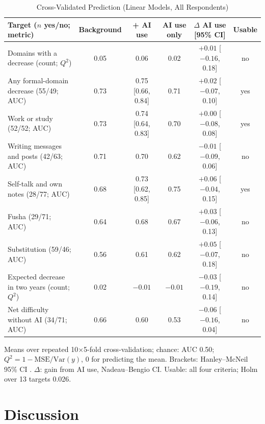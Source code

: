 \documentclass[conference]{IEEEtran}
\begin{document}
\begin{table}[t]
\centering
\begin{threeparttable}
\caption{Cross-Validated Prediction (Linear Models, All Respondents)}
\label{tab:ml}
\footnotesize
\begin{tabular}{@{}lccccc@{}}
\toprule
Target ($n$ yes/no; metric) & Background & + AI use & AI use only & $\Delta$ AI use [95\% CI] & Usable \\
\midrule
Domains with a decrease (count; $Q^2$) & 0.05 & 0.06 & 0.02 & $+0.01$ [$-0.16$, 0.18] & no \\
Any formal-domain decrease (55/49; AUC) & 0.73 & 0.75 [0.66, 0.84] & 0.71 & $+0.02$ [$-0.07$, 0.10] & yes \\
Work or study (52/52; AUC) & 0.73 & 0.74 [0.64, 0.83] & 0.70 & $+0.00$ [$-0.08$, 0.08] & yes \\
Writing messages and posts (42/63; AUC) & 0.71 & 0.70 & 0.62 & $-0.01$ [$-0.09$, 0.06] & no \\
Self-talk and own notes (28/77; AUC) & 0.68 & 0.73 [0.62, 0.85] & 0.75 & $+0.06$ [$-0.04$, 0.15] & yes \\
Fusha (29/71; AUC) & 0.64 & 0.68 & 0.67 & $+0.03$ [$-0.06$, 0.13] & no \\
\midrule
Substitution (59/46; AUC) & 0.56 & 0.61 & 0.62 & $+0.05$ [$-0.07$, 0.18] & no \\
Expected decrease in two years (count; $Q^2$) & 0.02 & $-0.01$ & $-0.01$ & $-0.03$ [$-0.19$, 0.14] & no \\
Net difficulty without AI (34/71; AUC) & 0.66 & 0.60 & 0.53 & $-0.06$ [$-0.16$, 0.04] & no \\
\bottomrule
\end{tabular}
\begin{tablenotes}[flushleft]\footnotesize
\item Means over repeated 10$\times$5-fold cross-validation; chance: AUC 0.50; $Q^2=1-\mathrm{MSE}/\mathrm{Var}(y)$, 0 for predicting the mean. Brackets: Hanley--McNeil 95\% CI \cite{hanley1982}. $\Delta$: gain from AI use, Nadeau--Bengio CI. Usable: all four criteria; Holm over 13 targets 0.026.
\end{tablenotes}
\end{threeparttable}
\end{table}

\section{Discussion}
\end{document}
